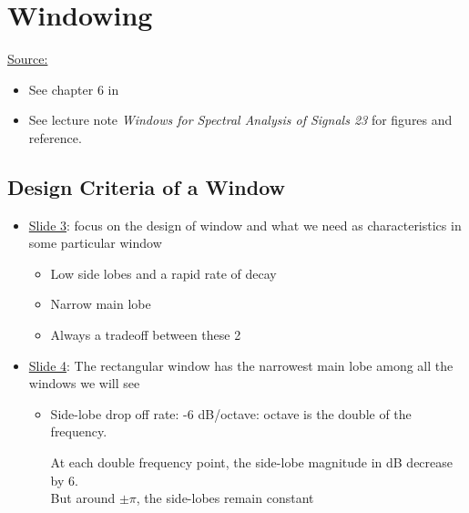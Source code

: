 \documentclass[12pt,a4paper]{book}
\begin{document}
\chapter{Windowing}

\underline{Source:} 

\begin{itemize}

    \item See chapter 6 in \cite{book_a_course_in_DSP_Porat}

    \item See lecture note \textit{Windows for Spectral Analysis of Signals 23} for figures and reference.
\end{itemize}



\section{Design Criteria of a Window}

\begin{itemize}

\item \underline{Slide 3}: focus on the design of window and what we need as characteristics in some particular window

\begin{itemize}
    \item Low side lobes and a rapid rate of decay
    
    \item Narrow main lobe
    
    
    \item Always a tradeoff between these 2
    
\end{itemize}


\item \underline{Slide 4}: The rectangular window has the narrowest main lobe among all the windows we will see

\begin{itemize}
    \item Side-lobe drop off rate: -6 dB/octave: octave is the double of the frequency.
    
    At each double frequency point, the side-lobe magnitude in dB decrease by 6.\\
    
    But around $\pm \pi$, the side-lobes remain constant

    
\end{itemize}

\end{itemize}
\end{document}
